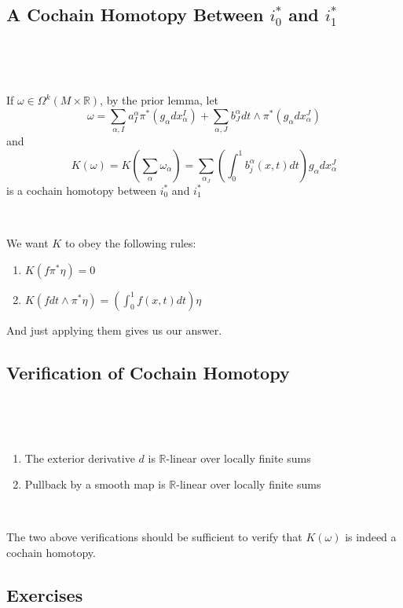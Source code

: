 \documentclass{article}
\begin{document}
\subsection{A Cochain Homotopy Between $i_0^*$ and $i_1^*$}
\

\begin{proposition}
\

If $\omega \in \Omega^k(M \times \mathbb{R})$, by the prior lemma, let $$\omega = \sum_{\alpha, I} a_I^\alpha \pi^*(g_\alpha dx^I_\alpha) + \sum_{\alpha, J} b_J^\alpha dt\wedge \pi^*(g_\alpha dx^J_\alpha)$$and$$K(\omega) = K(\sum_{\alpha} \omega_\alpha) = \sum_{\alpha_J}(\int_0^1 b_j^\alpha(x,t) dt) g_\alpha dx^J_\alpha$$is a cochain homotopy between $i_0^*$ and $i_1^*$
\end{proposition}

\begin{customproof}
\

We want $K$ to obey the following rules: 

\begin{enumerate}
  \item $K(f\pi^*\eta) = 0$
  \item $K(fdt\wedge \pi^*\eta) = (\int_0^1f(x,t)dt)\eta$
\end{enumerate}

And just applying them gives us our answer.
\end{customproof}

\subsection{Verification of Cochain Homotopy}
\

\begin{lemma}
\

\begin{enumerate}
  \item The exterior derivative $d$ is $\mathbb{R}$-linear over locally finite sums
  \item Pullback by a smooth map is $\mathbb{R}$-linear over locally finite sums
\end{enumerate}
\end{lemma}

\begin{remark}
\

The two above verifications should be sufficient to verify that $K(\omega)$ is indeed a cochain homotopy.
\end{remark}

\subsection{Exercises}
\
\end{document}
